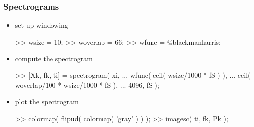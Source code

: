 \begin{frame}[fragile] %
	\frametitle{Spectrograms}
	\begin{itemize}
		\item set up windowing
			\begin{code}
>> wsize = 10; \color{medium}%
>> woverlap = 66; \color{medium}%
>> wfunc = @blackmanharris; \color{medium}%
			\end{code}
		\item compute the spectrogram
			\begin{code}
>> [Xk, fk, ti] = spectrogram( xi, ... \color{medium}%
	wfunc( ceil( wsize/1000 * fS ) ), ... \color{medium}%
	ceil( woverlap/100 * wsize/1000 * fS ), ... \color{medium}%
	4096, fS ); %
			\end{code}
		\item plot the spectrogram
			\begin{code}
>> colormap( flipud( colormap( 'gray' ) ) ); \color{medium} %
>> imagesc( ti, fk, Pk ); \color{medium} %
			\end{code}
	\end{itemize}
\end{frame}
